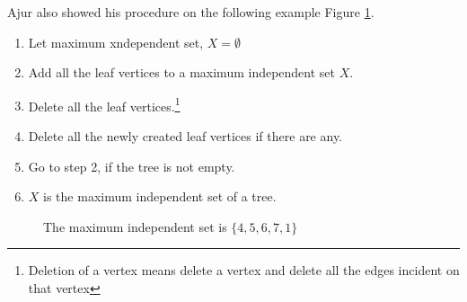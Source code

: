 Ajur also showed his procedure on the following example Figure \ref{13g4}.
\begin{enumerate}
    \item Let maximum xndependent set, $X=\emptyset$
    \item Add all the leaf vertices to a maximum independent set $X$.
    \item Delete all the leaf vertices.\footnote {Deletion of a vertex means delete a vertex and delete all the edges incident on that vertex}
    \item Delete all the newly created leaf vertices if there are any.
    \item Go to step 2, if the tree is not empty.
    \item $X$ is the maximum independent set of a tree.
\end{enumerate}

\begin{figure}
\begin{center}

\caption{ The maximum independent set is $\{4,5,6,7,1\}$}\label{13g4}
\end{center}
\end{figure}

